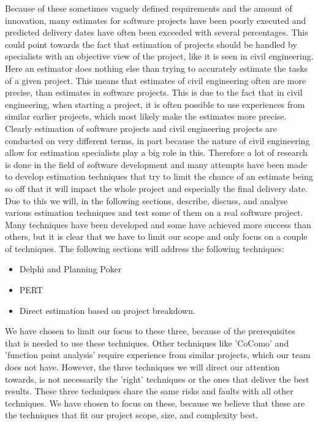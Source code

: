 Because of these sometimes vaguely defined requirements and the amount of innovation, many estimates for software projects have been poorly executed and predicted delivery dates have often been exceeded with several percentages. This could point towards the fact that estimation of projects should be handled by specialists with an objective view of the project, like it is seen in civil engineering. Here an estimator does nothing else than trying to accurately estimate the tasks of a given project\cite[p.140]{ProjectManagement_b}. This means that estimates of civil engineering often are more precise, than estimates in software projects. This is due to the fact that in civil engineering, when starting a project, it is often possible to use experiences from similar earlier projects, which most likely make the estimates more precise. \\
Clearly estimation of software projects and civil engineering projects are conducted on very different terms, in part because the nature of civil engineering allow for estimation specialists play a big role in this. Therefore a lot of research is done in the field of software development and many attempts have been made to develop estimation techniques that try to limit the chance of an estimate being so off that it will impact the whole project and especially the final delivery date. \\
Due to this we will, in the following sections, describe, discuss, and analyse various estimation techniques and test some of them on a real software project. Many techniques have been developed and some have achieved more success than others, but it is clear that we have to limit our scope and only focus on a couple of techniques. The following sections will address the following techniques:
\begin{itemize}
\item Delphi and Planning Poker  
\item PERT 
\item Direct estimation based on project breakdown.
\end{itemize}
We have chosen to limit our focus to these three, because of the prerequisites that is needed to use these techniques. Other techniques like 'CoComo' and 'function point analysis' require experience from similar projects, which our team does not have. However, the three techniques we will direct our attention towards, is not necessarily the 'right' techniques or the ones that deliver the best results. These three techniques share the same risks and faults with all other techniques. We have chosen to focus on these, because we believe that these are the techniques that fit our project scope, size, and complexity best.
\\


